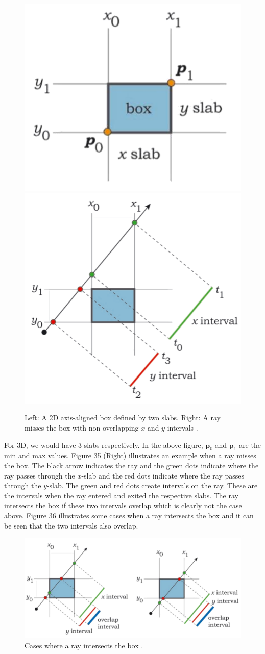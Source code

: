 \documentclass[11pt,a4paper]{article}
\begin{document}
	\begin{figure}[H]
		\centering
		\captionsetup{justification=centering}
		\includegraphics[width=.35\textwidth]{aabb1}\quad
		\includegraphics[width=.35\textwidth]{aabb2}\quad
		\caption{Left: A 2D axis-aligned box defined by two slabs. Right: A ray misses the box with non-overlapping $x$ and $y$ intervals \protect\cite{suffern2016ray}.}
	\end{figure}
	\noindent
	For 3D, we would have 3 slabs respectively. In the above figure, $\boldsymbol{p}_{0}$ and $\boldsymbol{p}_{1}$ are the min and max values. Figure 35 (Right) illustrates an example when a ray misses the box. The black arrow indicates the ray and the green dots indicate where the ray passes through the $x$-slab and the red dots indicate where the ray passes through the $y$-slab. The green and red dots create intervals on the ray. These are the intervals when the ray entered and exited the respective slabs. The ray intersects the box if these two intervals overlap which is clearly not the case above. Figure 36 illustrates some cases when a ray intersects the box and it can be seen that the two intervals also overlap.
	\begin{figure}[H]
		\centering
		\captionsetup{justification=centering}
		\includegraphics[width=.7\textwidth]{aabb3}\quad
		\caption{Cases where a ray intersects the box \protect\cite{suffern2016ray}.}
	\end{figure}
\end{document}
